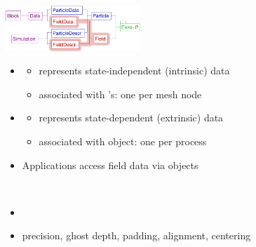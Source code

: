 \NEWSEC

\subsection{\ssFields}

\begin{frame}[fragile,label=ss-fields] 
\secframetitle{\ssFields}
\ \\
\includegraphics[width=2in]{data-classes-field.pdf}
\begin{itemize}
\item {}
\begin{itemize}
\item represents state-independent (intrinsic) data
\item associated with 's: one per mesh node
\end{itemize}
\item {}
\begin{itemize}
\item represents state-dependent (extrinsic) data
\item associated with  object: one per process
\end{itemize}
\item Applications access field data via  objects
\end{itemize}
\end{frame}

\begin{frame}[fragile] 
\secframetitle{\ssFields}
\ \\

\begin{itemize}
\item {}
\item precision, ghost depth, padding, alignment, centering
\end{itemize}
\end{frame}



